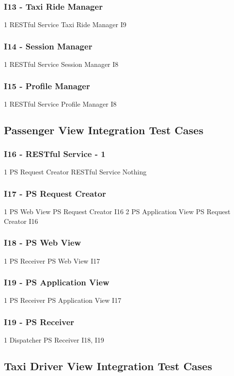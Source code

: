 \subsubsection{I13 - Taxi Ride Manager}
\testCaseSimpleSimple
	{1}
	{RESTful Service}
	{Taxi Ride Manager}
	{I9}
\subsubsection{I14 - Session Manager}
\testCaseSimpleSimple
	{1}
	{RESTful Service}
	{Session Manager}
	{I8}
\subsubsection{I15 - Profile Manager}
\testCaseSimpleSimple
	{1}
	{RESTful Service}
	{Profile Manager}
	{I8}
\subsection{Passenger View Integration Test Cases}
\subsubsection{I16 - RESTful Service - 1}
\testCaseSimpleSimple
	{1}
	{PS Request Creator}
	{RESTful Service}
	{Nothing}
\subsubsection{I17 - PS Request Creator}
\testCaseSimpleSimple
	{1}
	{PS Web View}
	{PS Request Creator}
	{I16}
\testCaseSimpleSimple
	{2}
	{PS Application View}
	{PS Request Creator}
	{I16}
\subsubsection{I18 - PS Web View}
\testCaseSimpleSimple
	{1}
	{PS Receiver}
	{PS Web View}
	{I17}
\subsubsection{I19 - PS Application View}
\testCaseSimpleSimple
	{1}
	{PS Receiver}
	{PS Application View}
	{I17}
\subsubsection{I19 - PS Receiver}
\testCaseSimpleSimple
	{1}
	{Dispatcher}
	{PS Receiver}
	{I18, I19}
\subsection{Taxi Driver View Integration Test Cases}
